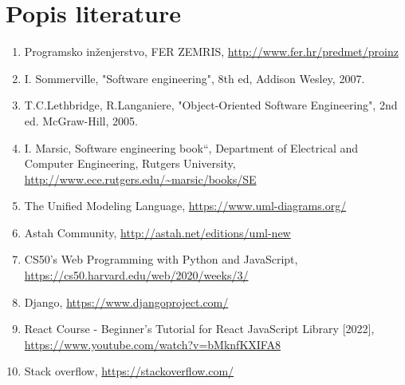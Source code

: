 \chapter*{Popis literature}
	 	
 		
		
		\begin{enumerate}
			
			
			\item  Programsko inženjerstvo, FER ZEMRIS, \url{http://www.fer.hr/predmet/proinz}
			
			\item  I. Sommerville, "Software engineering", 8th ed, Addison Wesley, 2007.
			
			\item  T.C.Lethbridge, R.Langaniere, "Object-Oriented Software Engineering", 2nd ed. McGraw-Hill, 2005.
			
			\item  I. Marsic, Software engineering book``, Department of Electrical and Computer Engineering, Rutgers University, \url{http://www.ece.rutgers.edu/~marsic/books/SE}
			
			\item  The Unified Modeling Language, \url{https://www.uml-diagrams.org/}
			
			\item  Astah Community, \url{http://astah.net/editions/uml-new}
			
			\item CS50’s Web Programming with Python and JavaScript, \url{https://cs50.harvard.edu/web/2020/weeks/3/}
			
			\item Django, \url{https://www.djangoproject.com/}
			
			\item React Course - Beginner's Tutorial for React JavaScript Library [2022], \url{https://www.youtube.com/watch?v=bMknfKXIFA8}
			
			\item Stack overflow, \url{https://stackoverflow.com/}
		\end{enumerate}
		
		 